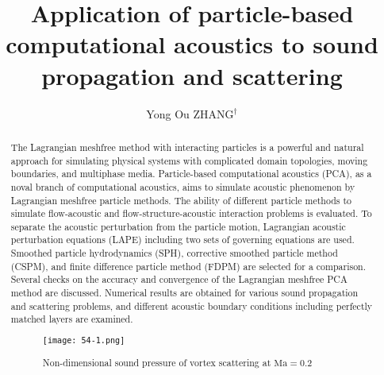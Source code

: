 \documentclass[10pt]{article}
\title{Application of particle-based computational acoustics to sound propagation and scattering}
\date{}
\author[$\relax$]{Yong Ou ZHANG$^\dagger$}
\affil[$\relax$]{School of Transportation, Wuhan University of Technology, China}
\affil[$\relax$]{\email{\dagger}{zhangyo@whut.edu.cn}}
\begin{document}
\maketitle


\begin{abstract}
The Lagrangian meshfree method with interacting particles is a powerful and natural approach for simulating physical systems with complicated domain topologies, moving boundaries, and multiphase media. Particle-based computational acoustics (PCA), as a noval branch of computational acoustics, aims to simulate acoustic phenomenon by Lagrangian meshfree particle methods. The ability of different particle methods to simulate flow-acoustic and flow-structure-acoustic interaction problems is evaluated. To separate the acoustic perturbation from the particle motion, Lagrangian acoustic perturbation equations (LAPE) including two sets of governing equations are used. Smoothed particle hydrodynamics (SPH), corrective smoothed particle method (CSPM), and finite difference particle method (FDPM) are selected for a comparison. Several checks on the accuracy and convergence of the Lagrangian meshfree PCA method are discussed. Numerical results are obtained for various sound propagation and scattering problems, and different acoustic boundary conditions including perfectly matched layers are examined.

\begin{figure}[!htb]
\centering
\texttt{[image: 54-1.png]}
\caption{Non-dimensional sound pressure of vortex scattering at $\mathrm{Ma} = 0.2$}\label{fig:}
\end{figure}

\end{abstract}



\end{document}
